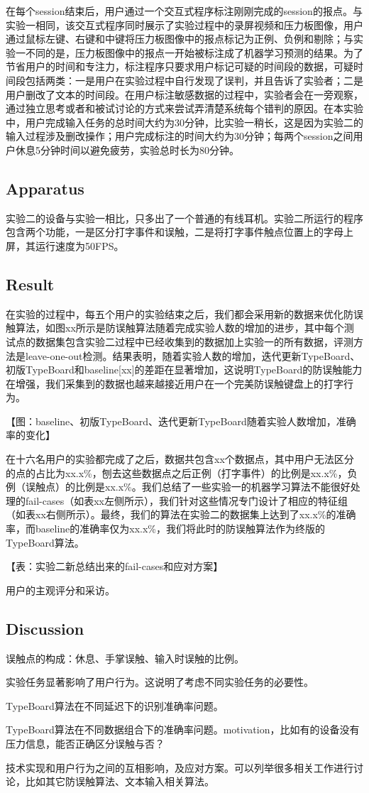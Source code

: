 在每个session结束后，用户通过一个交互式程序标注刚刚完成的session的报点。与实验一相同，该交互式程序同时展示了实验过程中的录屏视频和压力板图像，用户通过鼠标左键、右键和中键将压力板图像中的报点标记为正例、负例和剔除；与实验一不同的是，压力板图像中的报点一开始被标注成了机器学习预测的结果。为了节省用户的时间和专注力，标注程序只要求用户标记可疑的时间段的数据，可疑时间段包括两类：一是用户在实验过程中自行发现了误判，并且告诉了实验者；二是用户删改了文本的时间段。在用户标注敏感数据的过程中，实验者会在一旁观察，通过独立思考或者和被试讨论的方式来尝试弄清楚系统每个错判的原因。在本实验中，用户完成输入任务的总时间大约为30分钟，比实验一稍长，这是因为实验二的输入过程涉及删改操作；用户完成标注的时间大约为30分钟；每两个session之间用户休息5分钟时间以避免疲劳，实验总时长为80分钟。

\subsection{Apparatus}

实验二的设备与实验一相比，只多出了一个普通的有线耳机。实验二所运行的程序包含两个功能，一是区分打字事件和误触，二是将打字事件触点位置上的字母上屏，其运行速度为50FPS。

\subsection{Result}

在实验的过程中，每五个用户的实验结束之后，我们都会采用新的数据来优化防误触算法，如图xx所示是防误触算法随着完成实验人数的增加的进步，其中每个测试点的数据集包含实验二过程中已经收集到的数据加上实验一的所有数据，评测方法是leave-one-out检测。结果表明，随着实验人数的增加，迭代更新TypeBoard、初版TypeBoard和baseline[xx]的差距在显著增加，这说明TypeBoard的防误触能力在增强，我们采集到的数据也越来越接近用户在一个完美防误触键盘上的打字行为。

【图：baseline、初版TypeBoard、迭代更新TypeBoard随着实验人数增加，准确率的变化】

在十六名用户的实验都完成了之后，数据共包含xx个数据点，其中用户无法区分的点的占比为xx.x\%，刨去这些数据点之后正例（打字事件）的比例是xx.x\%，负例（误触点）的比例是xx.x\%。我们总结了一些实验一的机器学习算法不能很好处理的fail-cases（如表xx左侧所示），我们针对这些情况专门设计了相应的特征组（如表xx右侧所示）。最终，我们的算法在实验二的数据集上达到了xx.x\%的准确率，而baseline的准确率仅为xx.x\%，我们将此时的防误触算法作为终版的TypeBoard算法。

【表：实验二新总结出来的fail-cases和应对方案】

用户的主观评分和采访。

\subsection{Discussion}

误触点的构成：休息、手掌误触、输入时误触的比例。

实验任务显著影响了用户行为。这说明了考虑不同实验任务的必要性。

TypeBoard算法在不同延迟下的识别准确率问题。

TypeBoard算法在不同数据组合下的准确率问题。motivation，比如有的设备没有压力信息，能否正确区分误触与否？

技术实现和用户行为之间的互相影响，及应对方案。可以列举很多相关工作进行讨论，比如其它防误触算法、文本输入相关算法。
